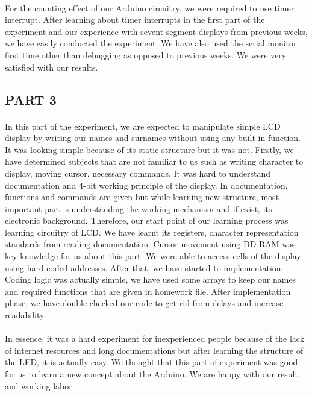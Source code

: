 \documentclass[pdftex,12pt,a4paper]{article}
\begin{document}
\begin{flushleft}
\paragraph{}
For the counting effect of our Arduino circuitry, we were required to use timer interrupt. After learning about timer interrupts in the first part of the experiment and our experience with sevent segment displays from previous weeks, we have easily conducted the experiment. We have also used the serial monitor first time other than debugging as opposed to previous weeks. We were very satisfied with our results.  

\subsection{PART 3}
\paragraph{}
In this part of the experiment, we are expected to manipulate simple LCD display by writing our names and surnames without using any built-in function. It was looking simple because of its static structure but it was not. Firstly, we have determined subjects that are not familiar to us such as writing character to display, moving cursor, necessary commands. It was hard to understand documentation and 4-bit working principle of the display. In documentation, functions and commands are given but while learning new structure, most important part is understanding the working mechanism and if exist, its electronic background. Therefore, our start point of our learning process was learning circuitry of LCD. We have learnt its registers, character representation standards from reading documentation. Cursor movement using DD RAM was key knowledge for us about this part. We were able to access cells of the display using hard-coded addresses. After that, we have started to implementation. Coding logic was actually simple, we have used some arrays to keep our names and required functions that are given in homework file. After implementation phase, we have double checked our code to get rid from delays and increase readability.
\paragraph{}
In essence, it was a hard experiment for inexperienced people because of the lack of internet resources and long documentations but after learning the structure of the LED, it is actually easy. We thought that this part of experiment was good for us to learn a new concept about the Arduino. We are happy with our result and working labor.

\end{flushleft}
\end{document}
